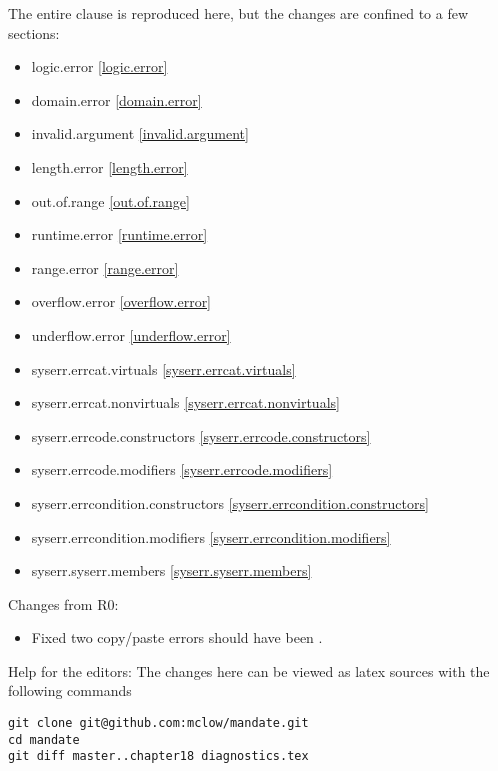 The entire clause is reproduced here, but the changes are confined to a few sections:

\begin{multicols}{2}
\begin{itemize}
\item{logic.error                       \ref{logic.error}}
\item{domain.error                      \ref{domain.error}}
\item{invalid.argument                  \ref{invalid.argument}}
\item{length.error                      \ref{length.error}}
\item{out.of.range                      \ref{out.of.range}}
\item{runtime.error                     \ref{runtime.error}}
\item{range.error                       \ref{range.error}}
\item{overflow.error                    \ref{overflow.error}}
\item{underflow.error                   \ref{underflow.error}}
\item{syserr.errcat.virtuals            \ref{syserr.errcat.virtuals}}
\item{syserr.errcat.nonvirtuals         \ref{syserr.errcat.nonvirtuals}}
\item{syserr.errcode.constructors       \ref{syserr.errcode.constructors}}
\item{syserr.errcode.modifiers          \ref{syserr.errcode.modifiers}}
\item{syserr.errcondition.constructors  \ref{syserr.errcondition.constructors}}
\item{syserr.errcondition.modifiers     \ref{syserr.errcondition.modifiers}}
\item{syserr.syserr.members             \ref{syserr.syserr.members}}
\end{itemize}
\end{multicols}

Changes from R0:
\begin{itemize}
\item{Fixed two copy/paste errors  should have been .}
\end{itemize}

\vfill
Help for the editors: The changes here can be viewed as latex sources with the following commands
\begin{verbatim}
git clone git@github.com:mclow/mandate.git
cd mandate
git diff master..chapter18 diagnostics.tex
\end{verbatim}
\newpage
